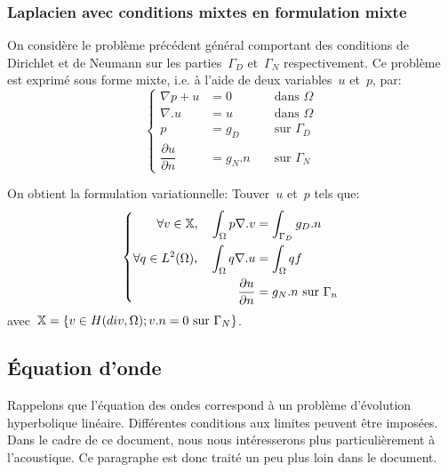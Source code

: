\medskip
\subsubsection{Laplacien avec conditions mixtes en formulation mixte}
On considère le problème précédent général comportant des conditions de Dirichlet et de Neumann sur les parties~$\Gamma_D$ et~$\Gamma_N$ respectivement. Ce problème est exprimé sous forme mixte, i.e. à l'aide de deux variables~$u$ et~$p$, par:
\begin{equation}\left\{\begin{aligned}
\nabla p + u &=0 &&\text{ dans } \Omega\\
\nabla.u &=u &&\text{ dans } \Omega\\
p&=g_D &&\text{ sur } \Gamma_D\\
\dfrac{\partial u}{\partial n} &=g_N.n &&\text{ sur } \Gamma_N
\end{aligned}
\right.
\end{equation}

\medskip
On obtient la formulation variationnelle: Touver~$u$ et~$p$ tels que:
\begin{equation}
\left\{\begin{aligned}
\forall v\in\mathbb X ,\quad \displaystyle\int_\Omega p\nabla.v &= \displaystyle\int_{\Gamma_D} g_D.n\\
\forall q\in L^2(\Omega), \quad \displaystyle\int_\Omega q\nabla.u &= \displaystyle\int_\Omega qf\\
\dfrac{\partial u}{\partial n} &=g_N.n \text{ sur } \Gamma_n
\end{aligned}
\right. 
\end{equation}
avec~$\mathbb X=\{v\in H(div,\Omega); v.n=0 \text{ sur } \Gamma_N\}$.


\medskip
\subsection{Équation d'onde}
Rappelons que l'équation des ondes correspond à un problème d'évolution hyperbolique linéaire. Différentes conditions aux limites peuvent être imposées. Dans le cadre de ce document, nous nous intéresserons plus particulièrement à l'acoustique. Ce paragraphe est donc traité un peu plus loin dans le document.

